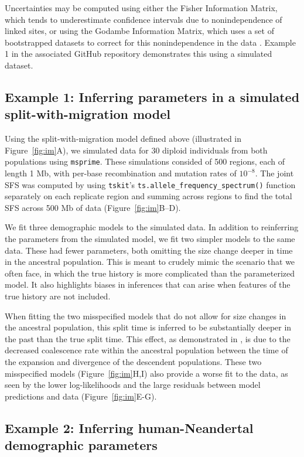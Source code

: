 \documentclass[]{article}
\newcommand{\msprime}{\texttt{msprime}\xspace}
\newcommand{\tskit}{\texttt{tskit}\xspace}
\begin{document}
Uncertainties may be computed using either the Fisher Information Matrix, which
tends to underestimate confidence intervals due to nonindependence of linked
sites, or using the Godambe Information Matrix, which uses a set of
bootstrapped datasets to correct for this nonindependence in the data
\cite{coffman2016computationally}. Example 1 in the associated GitHub
repository demonstrates this using a simulated dataset.

\subsection*{Example 1: Inferring parameters in a simulated split-with-migration model}

Using the split-with-migration model defined above (illustrated in
Figure~\ref{fig:im}A), we simulated data for 30 diploid individuals from both
populations using \msprime \cite{baumdicker2022efficient}. These simulations
consided of 500 regions, each of length 1 Mb, with per-base recombination and
mutation rates of $10^{-8}$. The joint SFS was computed by using \tskit's
\texttt{ts.allele\_frequency\_spectrum()} function separately on each replicate
region and summing across regions to find the total SFS across 500 Mb of data
(Figure~\ref{fig:im}B--D).

We fit three demographic models to the simulated data. In addition to
reinferring the parameters from the simulated model, we fit two simpler models
to the same data. These had fewer parameters, both omitting the size change
deeper in time in the ancestral population. This is meant to crudely mimic the
scenario that we often face, in which the true history is more complicated than
the parameterized model. It also highlights biases in inferences that can arise
when features of the true history are not included.

When fitting the two misspecified models that do not allow for size changes in
the ancestral population, this split time is inferred to be substantially
deeper in the past than the true split time. This effect, as demonstrated in
\cite{momigliano2021biases}, is due to the decreased coalescence rate within
the ancestral population between the time of the expansion and divergence of
the descendent populations. These two misspecified models
(Figure~\ref{fig:im}H,I) also provide a worse fit to the data, as seen by the
lower log-likelihoods and the large residuals between model predictions and
data (Figure~\ref{fig:im}E-G).

\subsection*{Example 2: Inferring human-Neandertal demographic parameters}
\end{document}
